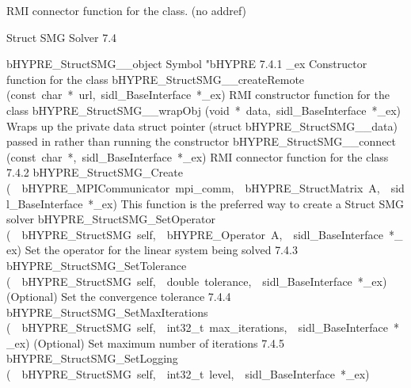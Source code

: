 \documentclass{article}
\begin{document}
\begin{cxxentry}
\begin{cxxentry}
\begin{cxxvariable}
\begin{cxxdoc}
RMI connector function for the class. (no addref)
\end{cxxdoc}
\end{cxxvariable}
\end{cxxentry}
\begin{cxxentry}
{}
        {Struct SMG Solver}
        {}
        {
}
        {7.4}
\begin{cxxnames}
        {bHYPRE\_StructSMG\_\_object}
        {}
        {
Symbol "bHYPRE}
        {7.4.1}
        {\_ex}
        {}
        {
Constructor function for the class}
        {}
\label{cxx.7.4.11}
        {bHYPRE\_StructSMG\_\_createRemote}
        {(const\ char\ *\ url,\ sidl\_BaseInterface\ *\_ex)}
        {
RMI constructor function for the class}
        {}
\label{cxx.7.4.12}
        {bHYPRE\_StructSMG\_\_wrapObj}
        {(void\ *\ data,\ sidl\_BaseInterface\ *\_ex)}
        {
Wraps up the private data struct pointer (struct bHYPRE\_StructSMG\_\_data) passed in rather than running the constructor}
        {}
\label{cxx.7.4.13}
        {bHYPRE\_StructSMG\_\_connect}
        {(const\ char\ *,\ sidl\_BaseInterface\ *\_ex)}
        {
RMI connector function for the class}
        {7.4.2}
        {bHYPRE\_StructSMG\_Create}
        {(\ \ bHYPRE\_MPICommunicator\ mpi\_comm,\ \ bHYPRE\_StructMatrix\ A,\ \ sidl\_BaseInterface\ *\_ex)}
        {
This function is the preferred way to create a Struct SMG solver}
        {}
\label{cxx.7.4.14}
        {bHYPRE\_StructSMG\_SetOperator}
        {(\ \ bHYPRE\_StructSMG\ self,\ \ bHYPRE\_Operator\ A,\ \ sidl\_BaseInterface\ *\_ex)}
        {
Set the operator for the linear system being solved}
        {7.4.3}
        {bHYPRE\_StructSMG\_SetTolerance}
        {(\ \ bHYPRE\_StructSMG\ self,\ \ double\ tolerance,\ \ sidl\_BaseInterface\ *\_ex)}
        {
(Optional) Set the convergence tolerance}
        {7.4.4}
        {bHYPRE\_StructSMG\_SetMaxIterations}
        {(\ \ bHYPRE\_StructSMG\ self,\ \ int32\_t\ max\_iterations,\ \ sidl\_BaseInterface\ *\_ex)}
        {
(Optional) Set maximum number of iterations}
        {7.4.5}
        {bHYPRE\_StructSMG\_SetLogging}
        {(\ \ bHYPRE\_StructSMG\ self,\ \ int32\_t\ level,\ \ sidl\_BaseInterface\ *\_ex)}

\end{cxxnames}
\end{cxxentry}
\end{cxxentry}
\end{document}
